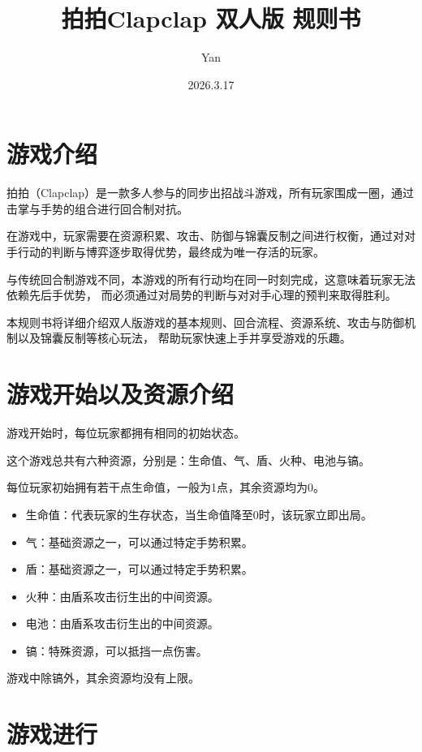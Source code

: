\documentclass[12pt]{ctexart}
\author{Yan}
\title{拍拍Clapclap 双人版 规则书}
\date{2026.3.17}
\begin{document}
\maketitle
\tableofcontents
\newpage

\section{游戏介绍}

拍拍（Clapclap）是一款多人参与的同步出招战斗游戏，所有玩家围成一圈，通过击掌与手势的组合进行回合制对抗。

在游戏中，玩家需要在资源积累、攻击、防御与锦囊反制之间进行权衡，通过对对手行动的判断与博弈逐步取得优势，最终成为唯一存活的玩家。

与传统回合制游戏不同，本游戏的所有行动均在同一时刻完成，这意味着玩家无法依赖先后手优势，
而必须通过对局势的判断与对对手心理的预判来取得胜利。

本规则书将详细介绍双人版游戏的基本规则、回合流程、资源系统、攻击与防御机制以及锦囊反制等核心玩法，
帮助玩家快速上手并享受游戏的乐趣。

\section{游戏开始以及资源介绍}

游戏开始时，每位玩家都拥有相同的初始状态。

这个游戏总共有六种资源，分别是：生命值、气、盾、火种、电池与镐。

每位玩家初始拥有若干点生命值，一般为1点，其余资源均为0。

\begin{itemize}
    \item 生命值：代表玩家的生存状态，当生命值降至0时，该玩家立即出局。
    \item 气：基础资源之一，可以通过特定手势积累。
    \item 盾：基础资源之一，可以通过特定手势积累。
    \item 火种：由盾系攻击衍生出的中间资源。
    \item 电池：由盾系攻击衍生出的中间资源。
    \item 镐：特殊资源，可以抵挡一点伤害。
\end{itemize}

游戏中除镐外，其余资源均没有上限。

\section{游戏进行}
\end{document}
